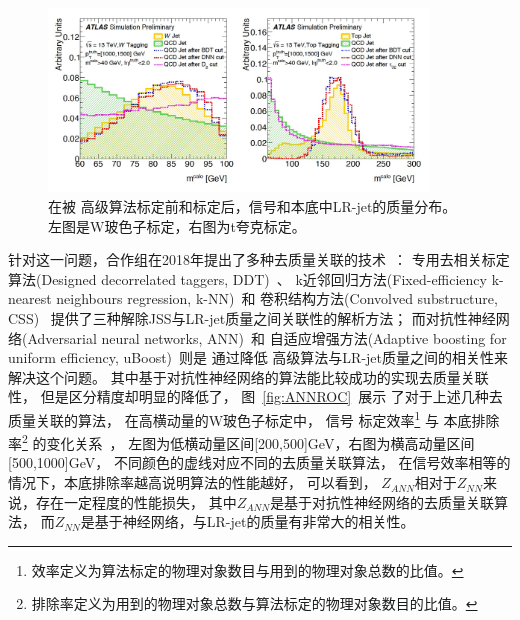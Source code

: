 \begin{figure}
  \begin{center}
    \includegraphics[width=0.9\textwidth]{figuresXbb/MSCULP.jpg}
  \end{center}
  \caption{
在被
高级算法标定前和标定后，信号和本底中LR-jet的质量分布。
左图是W玻色子标定，右图为t夸克标定。
  }
    \label{fig:MSCULP}
\end{figure}



针对这一问题，合作组在2018年提出了多种去质量关联的技术~\cite{ATL-PHYS-PUB-2018-014}：
专用去相关标定算法(Designed decorrelated taggers, DDT)~\cite{DDT}、
k近邻回归方法(Fixed-efficiency k-nearest neighbours regression, k-NN)~\cite{KNN}和
卷积结构方法(Convolved substructure, CSS)~\cite{CSS}
提供了三种解除JSS与LR-jet质量之间关联性的解析方法；
而对抗性神经网络(Adversarial neural networks, ANN)~\cite{ANN}和
自适应增强方法(Adaptive boosting for uniform efficiency, uBoost)~\cite{UBOOST}则是
通过降低
高级算法与LR-jet质量之间的相关性来解决这个问题。
其中基于对抗性神经网络的算法能比较成功的实现去质量关联性，
但是区分精度却明显的降低了，
图~\ref{fig:ANNROC}~展示
了对于上述几种去质量关联的算法，
在高横动量的W玻色子标定中，
信号
标定效率\footnote{效率定义为算法标定的物理对象数目与用到的物理对象总数的比值。}
与
本底排除率\footnote{排除率定义为用到的物理对象总数与算法标定的物理对象数目的比值。}
的变化关系~\cite{ATL-PHYS-PUB-2018-014}，
左图为低横动量区间[200,500]GeV，右图为横高动量区间[500,1000]GeV，
不同颜色的虚线对应不同的去质量关联算法，
在信号效率相等的情况下，本底排除率越高说明算法的性能越好，
可以看到，
$Z_{ANN}$相对于$Z_{NN}$来说，存在一定程度的性能损失，
其中$Z_{ANN}$是基于对抗性神经网络的去质量关联算法，
而$Z_{NN}$是基于神经网络，与LR-jet的质量有非常大的相关性。


